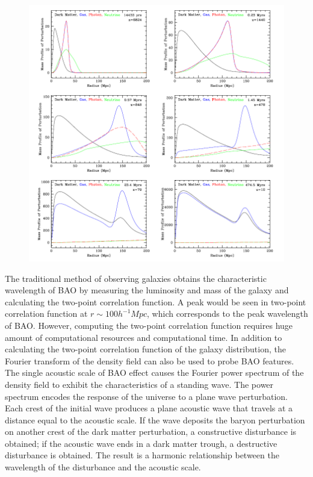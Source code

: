 \documentclass{article}
\begin{document}
\begin{figure}
    \centering
    \includegraphics[scale=0.5]{linearBAO.png}
    \caption{}
    \label{linearBAO}
\end{figure}

The traditional method of observing galaxies obtains the characteristic wavelength of BAO by measuring the luminosity and mass of the galaxy and calculating the two-point correlation function. A peak would be seen in two-point correlation function at $r\sim 100h^{-1}Mpc$, which corresponds to the peak wavelength of BAO. However, computing the two-point correlation function requires huge amount of computational resources and computational time. In addition to calculating the two-point correlation function of the galaxy distribution, the Fourier transform of the density field can also be used to probe BAO features. The single acoustic scale of BAO effect causes the Fourier power spectrum of the density field to exhibit the characteristics of a standing wave. The power spectrum encodes the response of the universe to a plane wave perturbation. Each crest of the initial wave produces a plane acoustic wave that travels at a distance equal to the acoustic scale. If the wave deposits the baryon perturbation on another crest of the dark matter perturbation, a constructive disturbance is obtained; if the acoustic wave ends in a dark matter trough, a destructive disturbance is obtained. The result is a harmonic relationship between the wavelength of the disturbance and the acoustic scale.
\end{document}
